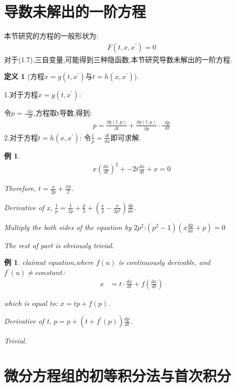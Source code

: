 \documentclass[12pt, a4paper, oneside]{ctexbook}
\newtheorem{definition}[theorem]{定义}
\newtheorem{example}[theorem]{例}
\newcommand*{\dif}{\mathop{}\!\mathrm{d}}
\begin{document}
    \section{导数未解出的一阶方程}
        本节研究的方程的一般形状为:
        \begin{align}
            F(t,x,x^{'})=0
        \end{align}
        对于(1.7),三自变量,可能得到三种隐函数,本节研究导数未解出的一阶方程.
        \begin{definition}[方程$x = g(t,x^{'})$与$t = h(x,x^{'})$]
        \end{definition}
        1.对于方程$x = g(t,x^{'})$:\par
        令$p=\frac{\dif x}{\dif t}$,方程取t导数,得到:
        \begin{align}
            p = \frac{\partial g(t,p)}{\partial t}+\frac{\partial g(t,p)}{\partial p}\cdot \frac{\dif p}{\dif t}
        \end{align}
        2.对于方程$t = h(x,x^{'})$:
        令$\frac{1}{p} = \frac{dt}{dx}$即可求解.
        \begin{example}
            \begin{align}
                x(\frac{dx}{dt})^2+-2t\frac{dx}{dt}+x=0
            \end{align}\par
            Therefore, $t =\frac{x}{2p}+\frac{xp}{2}$.\par
            Derivative of x, $\frac{1}{p} = \frac{1}{2p}+\frac p2+ (\frac x2-\frac{x}{2p^2})\frac{dp}{dx}$.\par
            Multiply the both sides of the equation by $2p^2$:$(p^2-1)(x\frac{dp}{dx}+p)=0$\par
            The rest of part is obviously trivial.
        \end{example}
        \begin{example}
            clairaut equation,where $f(u)$ is continuously derivable, and $ f^{'}(u)\neq constant$:
            \begin{align}
                x &= t\cdot\frac{dx}{dt}+f(\frac{dx}{dt})
            \end{align}\par
            which is equal to: $ x = tp+f(p)$.\par
            Derivative of t, $ p = p + (t+f^{'}(p))\frac{dp}{dt} $.\par
            Trivial.
        \end{example}
    \section{微分方程组的初等积分法与首次积分}
\end{document}
